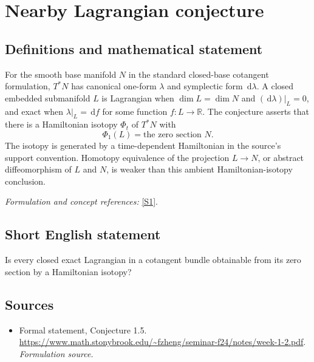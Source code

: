 \documentclass[11pt]{article}
\begin{document}
\section*{\texorpdfstring{Nearby Lagrangian conjecture}{Nearby Lagrangian conjecture}}\label{11300005}
\subsection{Definitions and mathematical statement}
For the smooth base manifold $N$ in the standard closed-base cotangent formulation, $T^*N$ has canonical one-form $\lambda$ and symplectic form ${\,\mathrm{d}}\lambda$. A closed embedded submanifold $L$ is Lagrangian when $\dim L=\dim N$ and $({\,\mathrm{d}}\lambda)|_L=0$, and exact when $\lambda|_L={\,\mathrm{d}} f$ for some function $f:L\to{\mathbb{R}}$. The conjecture asserts that there is a Hamiltonian isotopy $\Phi_t$ of $T^*N$ with
\[
 \Phi_1(L)=\text{the zero section }N.
\]
The isotopy is generated by a time-dependent Hamiltonian in the source's support convention. Homotopy equivalence of the projection $L\to N$, or abstract diffeomorphism of $L$ and $N$, is weaker than this ambient Hamiltonian-isotopy conclusion.
\par\smallskip\textit{Formulation and concept references:} \href{https://www.math.stonybrook.edu/~fzheng/seminar-f24/notes/week-1-2.pdf}{[S1]}.

\subsection{Short English statement}
Is every closed exact Lagrangian in a cotangent bundle obtainable from its zero section by a Hamiltonian isotopy?
\subsection{Sources}
\begin{itemize}
\item[S1]Formal statement, Conjecture 1.5.
\url{https://www.math.stonybrook.edu/~fzheng/seminar-f24/notes/week-1-2.pdf}.
\textit{Formulation source.}
\end{itemize}
\end{document}

